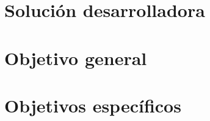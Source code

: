 \section{Soluci\'{o}n desarrolladora}
\begin{spacing}{1.5}
\end{spacing}
\section{Objetivo general}
\begin{spacing}{1.5}
\end{spacing}
\section{Objetivos espec\'{i}ficos}
\begin{spacing}{1.5}
\end{spacing}


	
